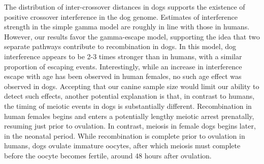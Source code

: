 The distribution of inter-crossover distances in dogs supports the existence of positive crossover interference in the dog genome.
Estimates of interference strength in the simple gamma model are roughly in line with those in humans.
However, our results favor the gamma-escape model, supporting the idea that two separate pathways contribute to recombination in dogs.
In this model, dog interference appears to be 2-3 times stronger than in humans, with a similar proportion of escaping events.
Interestingly, while an increase in interference escape with age has been observed in human females\cite{Campbell2015}, no such age effect was observed in dogs.
Accepting that our canine sample size would limit our ability to detect such effects, another
potential explanation is that, in contrast to humans, 
the timing of meiotic events in dogs is substantially different.
Recombination in human females begins and enters a potentially lengthy meiotic arrest prenatally, resuming just prior to ovulation.
In contrast, meiosis in female dogs begins later, in the neonatal period. %
While recombination is complete prior to ovulation in humans, dogs ovulate immature oocytes, after which meiosis must complete before the oocyte becomes fertile, around 48 hours after ovulation\cite{Freixa1987,Chastant-Maillard2011}.


